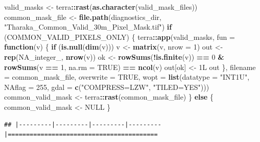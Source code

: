 \documentclass[
]{article}
\newenvironment{Shaded}{\begin{snugshade}}{\end{snugshade}}
\newcommand{\AttributeTok}[1]{\textcolor[rgb]{0.13,0.29,0.53}{#1}}
\newcommand{\ConstantTok}[1]{\textcolor[rgb]{0.56,0.35,0.01}{#1}}
\newcommand{\ControlFlowTok}[1]{\textcolor[rgb]{0.13,0.29,0.53}{\textbf{#1}}}
\newcommand{\DataTypeTok}[1]{\textcolor[rgb]{0.13,0.29,0.53}{#1}}
\newcommand{\DecValTok}[1]{\textcolor[rgb]{0.00,0.00,0.81}{#1}}
\newcommand{\FunctionTok}[1]{\textcolor[rgb]{0.13,0.29,0.53}{\textbf{#1}}}
\newcommand{\NormalTok}[1]{#1}
\newcommand{\OtherTok}[1]{\textcolor[rgb]{0.56,0.35,0.01}{#1}}
\newcommand{\SpecialCharTok}[1]{\textcolor[rgb]{0.81,0.36,0.00}{\textbf{#1}}}
\newcommand{\StringTok}[1]{\textcolor[rgb]{0.31,0.60,0.02}{#1}}
\begin{document}
\begin{Shaded}
\begin{Highlighting}[]
\NormalTok{valid\_masks }\OtherTok{\textless{}{-}}\NormalTok{ terra}\SpecialCharTok{::}\FunctionTok{rast}\NormalTok{(}\FunctionTok{as.character}\NormalTok{(valid\_mask\_files))}
\NormalTok{common\_mask\_file }\OtherTok{\textless{}{-}} \FunctionTok{file.path}\NormalTok{(diagnostics\_dir, }\StringTok{"Tharaka\_Common\_Valid\_30m\_Pixel\_Mask.tif"}\NormalTok{)}
\ControlFlowTok{if}\NormalTok{ (COMMON\_VALID\_PIXELS\_ONLY) \{}
\NormalTok{  terra}\SpecialCharTok{::}\FunctionTok{app}\NormalTok{(valid\_masks, }\AttributeTok{fun =} \ControlFlowTok{function}\NormalTok{(v) \{}
    \ControlFlowTok{if}\NormalTok{ (}\FunctionTok{is.null}\NormalTok{(}\FunctionTok{dim}\NormalTok{(v))) v }\OtherTok{\textless{}{-}} \FunctionTok{matrix}\NormalTok{(v, }\AttributeTok{nrow =} \DecValTok{1}\NormalTok{)}
\NormalTok{    out }\OtherTok{\textless{}{-}} \FunctionTok{rep}\NormalTok{(}\ConstantTok{NA\_integer\_}\NormalTok{, }\FunctionTok{nrow}\NormalTok{(v))}
\NormalTok{    ok }\OtherTok{\textless{}{-}} \FunctionTok{rowSums}\NormalTok{(}\SpecialCharTok{!}\FunctionTok{is.finite}\NormalTok{(v)) }\SpecialCharTok{==} \DecValTok{0} \SpecialCharTok{\&} \FunctionTok{rowSums}\NormalTok{(v }\SpecialCharTok{==} \DecValTok{1}\NormalTok{, }\AttributeTok{na.rm =} \ConstantTok{TRUE}\NormalTok{) }\SpecialCharTok{==} \FunctionTok{ncol}\NormalTok{(v)}
\NormalTok{    out[ok] }\OtherTok{\textless{}{-}} \DecValTok{1}\DataTypeTok{L}
\NormalTok{    out}
\NormalTok{  \}, }\AttributeTok{filename =}\NormalTok{ common\_mask\_file, }\AttributeTok{overwrite =} \ConstantTok{TRUE}\NormalTok{,}
     \AttributeTok{wopt =} \FunctionTok{list}\NormalTok{(}\AttributeTok{datatype =} \StringTok{"INT1U"}\NormalTok{, }\AttributeTok{NAflag =} \DecValTok{255}\NormalTok{, }\AttributeTok{gdal =} \FunctionTok{c}\NormalTok{(}\StringTok{"COMPRESS=LZW"}\NormalTok{, }\StringTok{"TILED=YES"}\NormalTok{)))}
\NormalTok{  common\_valid\_mask }\OtherTok{\textless{}{-}}\NormalTok{ terra}\SpecialCharTok{::}\FunctionTok{rast}\NormalTok{(common\_mask\_file)}
\NormalTok{\} }\ControlFlowTok{else}\NormalTok{ \{}
\NormalTok{  common\_valid\_mask }\OtherTok{\textless{}{-}} \ConstantTok{NULL}
\NormalTok{\}}
\end{Highlighting}
\end{Shaded}

\begin{verbatim}
## |---------|---------|---------|---------|=========================================                                          
\end{verbatim}
\end{document}
